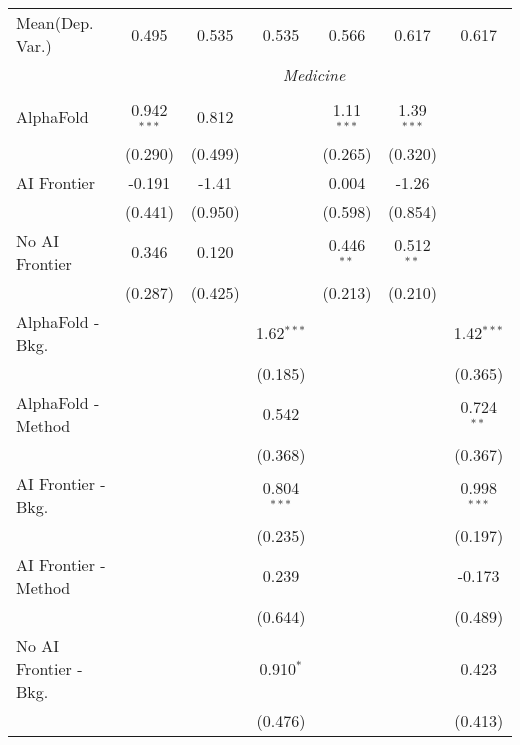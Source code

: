 \begin{tabular}{lcccccc}
Mean(Dep. Var.) & 0.495 & 0.535 & 0.535 & 0.566 & 0.617 & 0.617 \\
 & \multicolumn{6}{c}{\textit{Medicine}} \\ \\
   AlphaFold               & 0.942$^{***}$ & 0.812   &               & 1.11$^{***}$ & 1.39$^{***}$ &   \\   
                           & (0.290)       & (0.499) &               & (0.265)      & (0.320)      &   \\   
   AI Frontier             & -0.191        & -1.41   &               & 0.004        & -1.26        &   \\   
                           & (0.441)       & (0.950) &               & (0.598)      & (0.854)      &   \\   
   No AI Frontier          & 0.346         & 0.120   &               & 0.446$^{**}$ & 0.512$^{**}$ &   \\   
                           & (0.287)       & (0.425) &               & (0.213)      & (0.210)      &   \\   
   AlphaFold - Bkg.        &               &         & 1.62$^{***}$  &              &              & 1.42$^{***}$\\   
                           &               &         & (0.185)       &              &              & (0.365)\\   
   AlphaFold - Method      &               &         & 0.542         &              &              & 0.724$^{**}$\\   
                           &               &         & (0.368)       &              &              & (0.367)\\   
   AI Frontier - Bkg.      &               &         & 0.804$^{***}$ &              &              & 0.998$^{***}$\\   
                           &               &         & (0.235)       &              &              & (0.197)\\   
   AI Frontier - Method    &               &         & 0.239         &              &              & -0.173\\   
                           &               &         & (0.644)       &              &              & (0.489)\\   
   No AI Frontier - Bkg.   &               &         & 0.910$^{*}$   &              &              & 0.423\\   
                           &               &         & (0.476)       &              &              & (0.413)\\   

\end{tabular}
